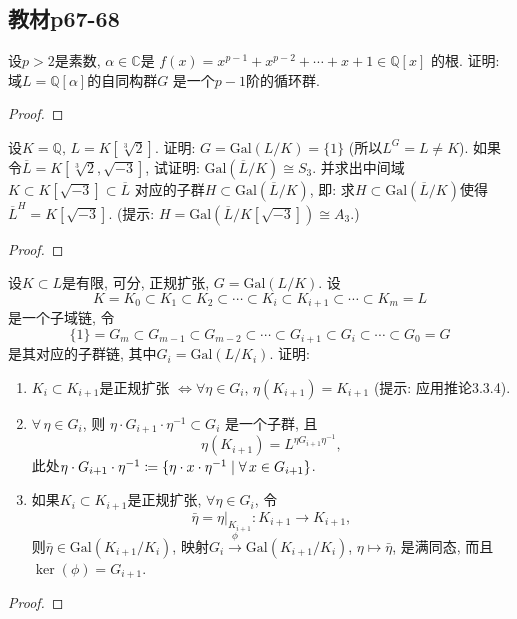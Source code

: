 \subsection{教材p67-68}

\begin{problem}
    设$p > 2$是素数, $\alpha \in \mathbb{C}$是
$f(x) = x^{p - 1} + x^{p - 2} + \cdots + x + 1 \in \mathbb{Q}[x]$
的根. 证明: 域$L = \mathbb{Q}[\alpha]$的自同构群$G$
是一个$p - 1$阶的循环群.
\end{problem}

\begin{proof}
    
\end{proof}

\begin{problem}
    设$K = \mathbb{Q},\, L = K[\sqrt[3]{2}]$.
证明: $G = \mathrm{Gal}(L/K)=\{1\}$ (所以$L^G = L \neq K$).
如果令$\overline{L} = K[\sqrt[3]{2}, \sqrt{-3}]$,
试证明: $\mathrm{Gal}(\overline{L}/K) \cong S_3$.
并求出中间域$K \subset K[\sqrt{-3}] \subset \overline{L}$
对应的子群$H \subset \mathrm{Gal}(\overline L/K)$,
即: 求$H \subset \mathrm{Gal}(\overline L/K)$使得
$\overline{L}^{H} = K[\sqrt{-3}]$.
(提示: $H = \mathrm{Gal}(\overline L/K[\sqrt{-3}]) \cong A_3$.)
\end{problem}

\begin{proof}
    
\end{proof}

\begin{problem}
    设$K \subset L$是有限, 可分, 正规扩张, $G = \mathrm{Gal}(L/K)$.
设
\[
    K = K_0 \subset K_1 \subset K_2 \subset \cdots \subset K_i \subset K_{i + 1} \subset \cdots \subset K_m = L
\]
是一个子域链, 令
\[
    \{1\} = G_m \subset G_{m - 1} \subset G_{m - 2} \subset \cdots \subset G_{i + 1} \subset G_i \subset \cdots \subset G_0 = G
\]
是其对应的子群链, 其中$G_i = \mathrm{Gal}(L/K_i)$. 证明: 
\begin{enumerate}[(1)]
    \item $K_i \subset K_{i + 1}$是正规扩张
$\Leftrightarrow \forall \eta \in G_i,\, \eta(K_{i + 1}) = K_{i + 1}$
(提示: 应用推论3.3.4).
    \item $\forall\, \eta \in G_i$, 则
$\eta \cdot G_{i + 1} \cdot \eta^{-1} \subset G_i$
是一个子群, 且
\[
    \eta(K_{i + 1}) = L^{\eta G_{i + 1}\eta^{-1}},
\]
此处$\eta \cdot G_{i + 1} \cdot \eta ^{- 1} \mathrel{\coloneqq} \{\eta \cdot x \cdot \eta^{-1} \mid \forall\, x \in G_{i + 1}\}$.
    \item 如果$K_i \subset K_{i + 1}$是正规扩张, $\forall \eta \in G_i$,
令
\[
    \bar{\eta} = \eta|_{K_{i + 1}}:K_{i + 1} \to K_{i + 1},
\]
则$\bar{\eta} \in \mathrm{Gal}(K_{i + 1}/K_i)$,
映射$G_i \overset{\phi}\to \mathrm{Gal}(K_{i + 1}/K_i)$,
$\eta \mapsto \bar{\eta}$, 是满同态, 而且
$\ker(\phi) = G_{i + 1}$.
\end{enumerate}
\end{problem}

\begin{proof}
    
\end{proof}